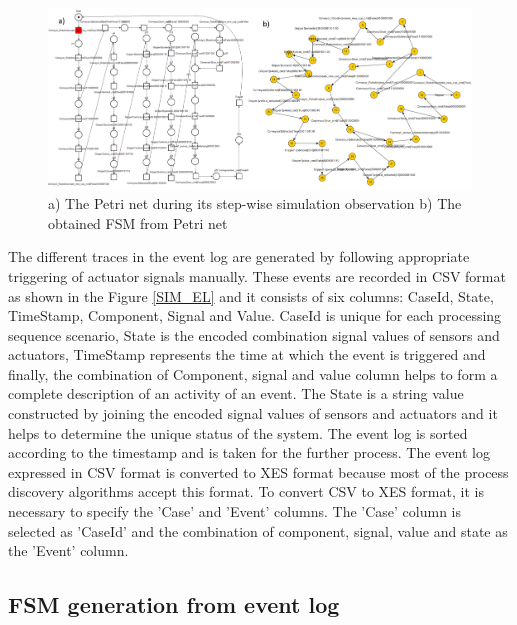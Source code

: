 \documentclass[conference]{IEEEtran}
\begin{document}
\begin{figure}[!t]
	\centering
	\includegraphics[width=1\textwidth]{images/PNFSMPNG.PNG}
	\caption{a) The Petri net during its step-wise simulation observation b) The obtained FSM from Petri net}
	\label{SIM_Yed}
\end{figure}


The different traces in the event log are generated by following appropriate triggering of actuator signals manually. These events are recorded in CSV format as shown in the Figure \ref{SIM_EL} and it consists of six columns: CaseId, State, TimeStamp, Component, Signal and Value. CaseId is unique for each processing sequence scenario, State is the encoded combination signal values of sensors and actuators, TimeStamp represents the time at which the event is triggered and finally, the combination of Component, signal and value column helps to form a complete description of an activity of an event. The State is a string value constructed by joining the encoded signal values of sensors and actuators and it helps to determine the unique status of the system. The event log is sorted according to the timestamp and is taken for the further process. The event log expressed in CSV format is converted to XES format because most of the process discovery algorithms accept this format. To convert CSV to XES format, it is necessary to specify the ’Case’ and ’Event’ columns. The ’Case’ column is  selected as ’CaseId’ and the combination of component, signal, value and state as the ’Event’ column.

\subsection{FSM generation from event log}
\end{document}
